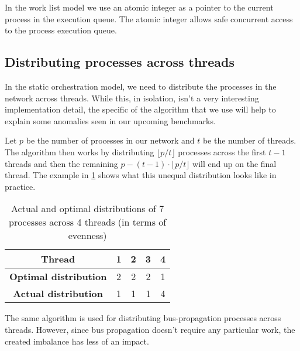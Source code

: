 In the work list model we use an atomic integer as a pointer to the
current process in the execution queue. The atomic integer allows safe
concurrent access to the process execution queue.



\subsection{Distributing processes across threads}
In the static orchestration model, we need to distribute the processes
in the network across threads. While this, in isolation, isn't a very
interesting implementation detail, the specific of the algorithm that
we use will help to explain some anomalies seen in our upcoming
benchmarks.

Let $p$ be the number of processes in our network and $t$ be the
number of threads. The algorithm then works by distributing
$\lfloor p/t\rfloor$ processes across the first $t-1$ threads and then
the remaining $p-(t-1)\cdot\lfloor p/t\rfloor$ will end up on the final
thread. The example in \cref{tab:procdist} shows what this unequal
distribution looks like in practice.

\begin{table}
\centering
\begin{tabular}{|c|c|c|c|c|}
\hline
\textbf{Thread} & \textbf{1} & \textbf{2} & \textbf{3} & \textbf{4} \\\hline
\textbf{Optimal distribution} & 2 & 2 & 2 & 1 \\\hline
\textbf{Actual distribution} & 1 & 1 & 1 & 4 \\\hline
\end{tabular}
\caption{Actual and optimal distributions of 7
  processes across 4 threads (in terms of evenness)}
\label{tab:procdist}
\end{table}

The same algorithm is used for distributing bus-propagation processes across
threads. However, since bus propagation doesn't require any particular
work, the created imbalance has less of an impact.


